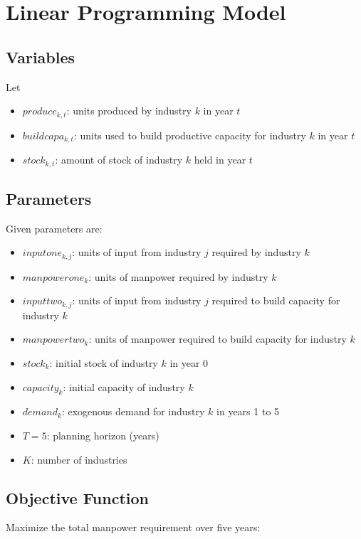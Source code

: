 \documentclass{article}
\begin{document}
\section*{Linear Programming Model}

\subsection*{Variables}
Let 
\begin{itemize}
    \item \( produce_{k,t} \): units produced by industry \( k \) in year \( t \)
    \item \( buildcapa_{k,t} \): units used to build productive capacity for industry \( k \) in year \( t \)
    \item \( stock_{k,t} \): amount of stock of industry \( k \) held in year \( t \)
\end{itemize}

\subsection*{Parameters}
Given parameters are:
\begin{itemize}
    \item \( inputone_{k,j} \): units of input from industry \( j \) required by industry \( k \)
    \item \( manpowerone_{k} \): units of manpower required by industry \( k \)
    \item \( inputtwo_{k,j} \): units of input from industry \( j \) required to build capacity for industry \( k \)
    \item \( manpowertwo_{k} \): units of manpower required to build capacity for industry \( k \)
    \item \( stock_{k} \): initial stock of industry \( k \) in year 0
    \item \( capacity_{k} \): initial capacity of industry \( k \)
    \item \( demand_{k} \): exogenous demand for industry \( k \) in years 1 to 5
    \item \( T = 5 \): planning horizon (years)
    \item \( K \): number of industries
\end{itemize}

\subsection*{Objective Function}
Maximize the total manpower requirement over five years:
\end{document}
